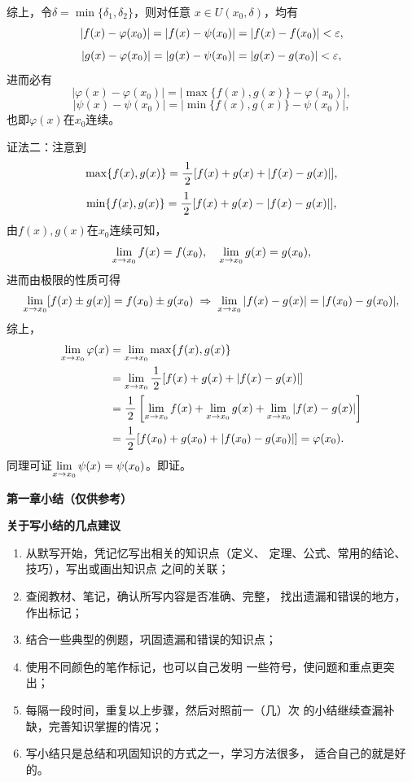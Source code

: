 综上，令$\delta=\min\{\delta_1,\delta_2\}$，则对任意
$x\in U(x_0,\delta)$，均有
$$|f(x)-\varphi(x_0)|=|f(x)-\psi(x_0)|=|f(x)-f(x_0)|<\varepsilon,$$
$$|g(x)-\varphi(x_0)|=|g(x)-\psi(x_0)|=|g(x)-g(x_0)|<\varepsilon,$$
进而必有
$$|\varphi(x)-\varphi(x_0)|=|\max\{f(x),g(x)\}-\varphi(x_0)|,$$
$$|\psi(x)-\psi(x_0)|=|\min\{f(x),g(x)\}-\psi(x_0)|,$$
也即$\varphi(x)$在$x_0$连续。\fin

证法二：注意到
$$\max\{f(x),g(x)\}=\displaystyle\frac{\,{1}\,}{\,{2}\,}[f(x)+g(x)+|f(x)-g(x)|],$$
$$\min\{f(x),g(x)\}=\displaystyle\frac{\,{1}\,}{\,{2}\,}[f(x)+g(x)-|f(x)-g(x)|],$$
由$f(x),g(x)$在$x_0$连续可知，
$$\lim\limits_{x\to{x_0}}f(x)=f(x_0),\quad
\lim\limits_{x\to{x_0}}g(x)=g(x_0),$$
进而由极限的性质可得
$$\lim\limits_{x\to{x_0}}[f(x)\pm g(x)]=f(x_0)\pm g(x_0)\;
\Rightarrow\;
\lim\limits_{x\to{x_0}}|f(x)-g(x)|=|f(x_0)-g(x_0)|,$$
综上，
\begin{align*}
	\lim\limits_{x\to{x_0}}\varphi(x)&=\lim\limits_{x\to{x_0}}\max\{f(x),g(x)\}\\
	&=\lim\limits_{x\to{x_0}}\displaystyle\frac{\,{1}\,}{\,{2}\,}[f(x)+g(x)+|f(x)-g(x)|]\\
	&=\displaystyle\frac{\,{1}\,}{\,{2}\,}\left[\lim\limits_{x\to{x_0}}f(x)+\lim\limits_{x\to{x_0}}g(x)+\lim\limits_{x\to{x_0}}|f(x)-g(x)|\right]\\
	&=\displaystyle\frac{\,{1}\,}{\,{2}\,}[f(x_0)+g(x_0)+|f(x_0)-g(x_0)|]=\varphi(x_0).
\end{align*}
同理可证$\lim\limits_{x\to{x_0}}\psi(x)=\psi(x_0)$。即证。
\fin

\newpage

\begin{center}
	\bf 第一章小结（仅供参考）
\end{center}

\begin{shaded}
	{\bf 关于写小结的几点建议}
	\kaishu
	\begin{enumerate}
		\setlength{\itemindent}{1cm}
		\item 从默写开始，凭记忆写出相关的知识点（定义、
		定理、公式、常用的结论、技巧），写出或画出知识点
		之间的关联；
		\item 查阅教材、笔记，确认所写内容是否准确、完整，
		找出遗漏和错误的地方，作出标记；
		\item 结合一些典型的例题，巩固遗漏和错误的知识点；
		\item 使用不同颜色的笔作标记，也可以自己发明
		一些符号，使问题和重点更突出；
		\item 每隔一段时间，重复以上步骤，然后对照前一（几）次
		的小结继续查漏补缺，完善知识掌握的情况；
		\item 写小结只是总结和巩固知识的方式之一，学习方法很多，
		适合自己的就是好的。
	\end{enumerate}
\end{shaded}

